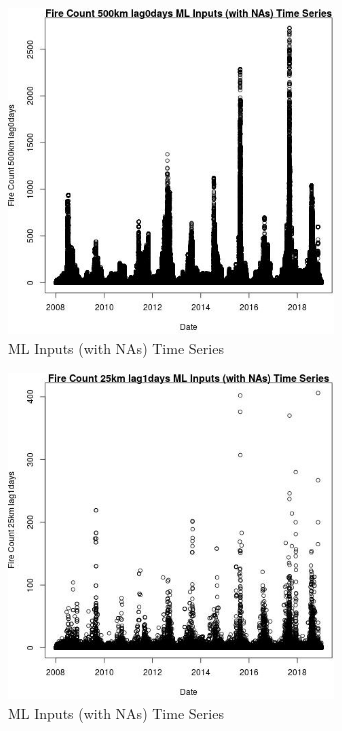 \begin{figure} 
\centering  
\includegraphics[width=0.77\textwidth]{Code_Outputs/Report_ML_input_PM25_Step4_part_f_de_duplicated_aveswNAs_Fire_Count_500km_lag0daysvDate.jpg} 
\caption{\label{fig:Report_ML_input_PM25_Step4_part_f_de_duplicated_aveswNAsFire_Count_500km_lag0daysvDate}ML Inputs (with NAs) Time Series} 
\end{figure} 
 

\begin{figure} 
\centering  
\includegraphics[width=0.77\textwidth]{Code_Outputs/Report_ML_input_PM25_Step4_part_f_de_duplicated_aveswNAs_Fire_Count_25km_lag1daysvDate.jpg} 
\caption{\label{fig:Report_ML_input_PM25_Step4_part_f_de_duplicated_aveswNAsFire_Count_25km_lag1daysvDate}ML Inputs (with NAs) Time Series} 
\end{figure} 
 

